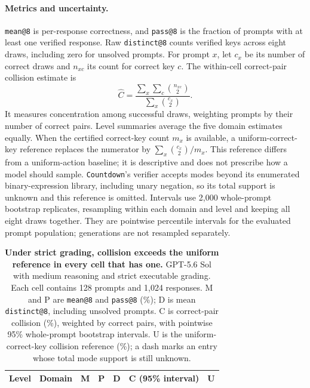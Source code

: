 \paragraph{Metrics and uncertainty.}
\texttt{mean@8} is per-response correctness, and \texttt{pass@8} is the fraction
of prompts with at least one verified response. Raw \texttt{distinct@8}
counts verified keys across eight draws, including zero for unsolved prompts.
For prompt $x$, let $c_x$ be its number of correct draws and $n_{xc}$ its count
for correct key $c$. The within-cell correct-pair collision estimate is
\[
  \widehat C=
  \frac{\sum_x\sum_c\binom{n_{xc}}{2}}
       {\sum_x\binom{c_x}{2}}.
\]
It measures concentration among successful draws, weighting prompts by their
number of correct pairs. Level summaries average the five
domain estimates equally. When the certified correct-key count $m_x$ is
available, a uniform-correct-key reference replaces the numerator by
$\sum_x\binom{c_x}{2}/m_x$. This reference differs from a uniform-action
baseline; it is descriptive and does not prescribe how a model should sample. \texttt{Countdown}'s
verifier accepts modes beyond its enumerated binary-expression library,
including unary negation, so its total support is unknown and this reference
is omitted. Intervals use 2,000 whole-prompt bootstrap replicates, resampling within
each domain and level and keeping all eight draws
together. They are pointwise percentile intervals for the evaluated prompt
population; generations are not resampled separately.

\begin{table}[!htbp]
  \centering
  \caption{\textbf{Under strict grading, collision exceeds the uniform reference in every cell that has one.}
  GPT-5.6 Sol with medium reasoning and strict executable grading. Each cell
  contains 128 prompts and 1,024 responses. M and P are \texttt{mean@8} and
  \texttt{pass@8} (\%); D is mean \texttt{distinct@8}, including unsolved
  prompts. C is correct-pair collision (\%), weighted by correct pairs, with
  pointwise 95\% whole-prompt bootstrap intervals. U is the uniform-correct-key
  collision reference (\%); a dash marks an entry whose total mode support is still unknown.}
  \label{tab:hosted-strict}
  \small
  \setlength{\tabcolsep}{4pt}
  \begin{tabular}{@{}rlrrrrr@{}}
    \toprule
    Level & Domain & M & P & D & C (95\% interval) & U \\
    \midrule
    
  \end{tabular}
\end{table}


